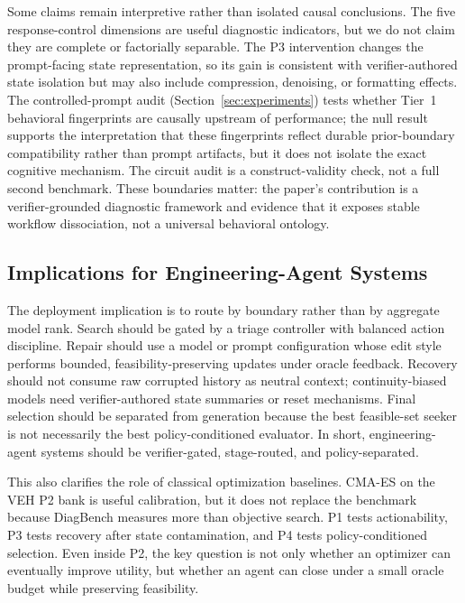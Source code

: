 Some claims remain interpretive rather than isolated causal conclusions. The five response-control dimensions are useful diagnostic indicators, but we do not claim they are complete or factorially separable. The P3 intervention changes the prompt-facing state representation, so its gain is consistent with verifier-authored state isolation but may also include compression, denoising, or formatting effects. The controlled-prompt audit (Section~\ref{sec:experiments}) tests whether Tier~1 behavioral fingerprints are causally upstream of performance; the null result supports the interpretation that these fingerprints reflect durable prior-boundary compatibility rather than prompt artifacts, but it does not isolate the exact cognitive mechanism. The circuit audit is a construct-validity check, not a full second benchmark. These boundaries matter: the paper's contribution is a verifier-grounded diagnostic framework and evidence that it exposes stable workflow dissociation, not a universal behavioral ontology.

\subsection{Implications for Engineering-Agent Systems}

The deployment implication is to route by boundary rather than by aggregate model rank. Search should be gated by a triage controller with balanced action discipline. Repair should use a model or prompt configuration whose edit style performs bounded, feasibility-preserving updates under oracle feedback. Recovery should not consume raw corrupted history as neutral context; continuity-biased models need verifier-authored state summaries or reset mechanisms. Final selection should be separated from generation because the best feasible-set seeker is not necessarily the best policy-conditioned evaluator. In short, engineering-agent systems should be verifier-gated, stage-routed, and policy-separated.

This also clarifies the role of classical optimization baselines. CMA-ES on the VEH P2 bank is useful calibration, but it does not replace the benchmark because DiagBench measures more than objective search. P1 tests actionability, P3 tests recovery after state contamination, and P4 tests policy-conditioned selection. Even inside P2, the key question is not only whether an optimizer can eventually improve utility, but whether an agent can close under a small oracle budget while preserving feasibility.

